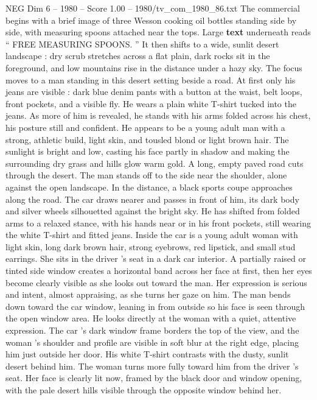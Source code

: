 \begin{textsample}{NEG Dim 6 – 1980 – Score 1.00 – 1980/tv\_com\_1980\_86.txt}  \label{ex:f6_neg_066}
The commercial begins with a brief image of three Wesson cooking oil bottles standing side by side, with measuring spoons attached near the tops.
Large \textbf{text} underneath reads “ FREE MEASURING SPOONS. ” It then shifts to a wide, sunlit desert landscape : dry scrub stretches across a flat plain, dark rocks sit in the foreground, and low mountains rise in the distance under a hazy sky.
The focus moves to a man standing in this desert setting beside a road.
At first only his jeans are visible : dark blue denim pants with a button at the waist, belt loops, front pockets, and a visible fly.
He wears a plain white T-shirt tucked into the jeans.
As more of him is revealed, he stands with his arms folded across his chest, his posture still and confident.
He appears to be a young adult man with a strong, athletic build, light skin, and tousled blond or light brown hair.
The sunlight is bright and low, casting his face partly in shadow and making the surrounding dry grass and hills glow warm gold.
A long, empty paved road cuts through the desert.
The man stands off to the side near the shoulder, alone against the open landscape.
In the distance, a black sports coupe approaches along the road.
The car draws nearer and passes in front of him, its dark body and silver wheels silhouetted against the bright sky.
He has shifted from folded arms to a relaxed stance, with his hands near or in his front pockets, still wearing the white T-shirt and fitted jeans.
Inside the car is a young adult woman with light skin, long dark brown hair, strong eyebrows, red lipstick, and small stud earrings.
She sits in the driver ’s seat in a dark car interior.
A partially raised or tinted side window creates a horizontal band across her face at first, then her eyes become clearly visible as she looks out toward the man.
Her expression is serious and intent, almost appraising, as she turns her gaze on him.
The man bends down toward the car window, leaning in from outside so his face is seen through the open window area.
He looks directly at the woman with a quiet, attentive expression.
The car ’s dark window frame borders the top of the view, and the woman ’s shoulder and profile are visible in soft blur at the right edge, placing him just outside her door.
His white T-shirt contrasts with the dusty, sunlit desert behind him.
The woman turns more fully toward him from the driver ’s seat.
Her face is clearly lit now, framed by the black door and window opening, with the pale desert hills visible through the opposite window behind her.

\end{textsample}
